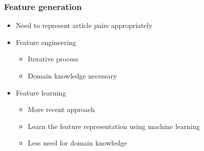 \begin{frame}
    \frametitle{Feature generation}
    \centering
    \begin{itemize}
      \item Need to represent article pairs appropriately
      \item Feature engineering
        \begin{itemize}
          \item Iterative process
          \item Domain knowledge necessary
        \end{itemize}
      \item Feature learning
        \begin{itemize}
          \item More recent approach
          \item Learn the feature representation using machine learning
          \item Less need for domain knowledge
        \end{itemize}
    \end{itemize}
\end{frame}
